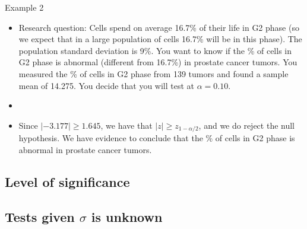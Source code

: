 \documentclass[xcolor=dvipsnames]{beamer}
\begin{document}
\begin{frame}{Example 2}
	\begin{itemize}
		\item Research question: Cells spend on average 16.7\% of their life in G2 phase (so we expect that in a large population of cells 16.7\% will be in this phase). The population standard deviation is 9\%. You want to know if the \% of cells in G2 phase is abnormal (different from 16.7\%) in prostate cancer tumors. You measured the \% of cells in G2 phase from 139 tumors and found a sample mean of 14.275. You decide that you will test at $\alpha = 0.10$.
		
		\item[]
		
		\item Since $|-3.177| \geq 1.645$, we have that $|z| \geq z_{1-\alpha / 2}$, and we do reject the null hypothesis. We have evidence to conclude that the \% of cells in G2 phase is abnormal in prostate cancer tumors. 
	\end{itemize}
\end{frame}

\subsection{Level of significance}

\subsection{Tests given $\sigma$ is unknown}
\end{document}

